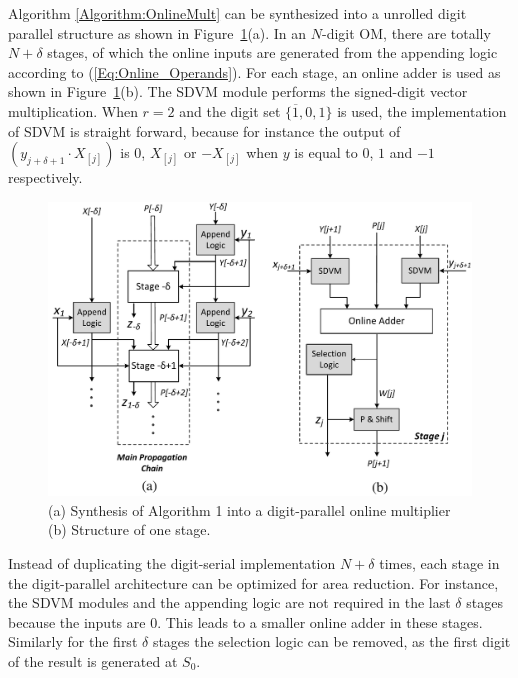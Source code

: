 \documentclass{acm_proc_article-sp}
\begin{document}
%
Algorithm \ref{Algorithm:OnlineMult} can be synthesized into a unrolled digit parallel structure as shown in  Figure~\ref{Fig:Radix2OnlineMultiplier}(a). In an $N$-digit OM, there are totally $N+\delta$ stages, of which the online inputs are generated from the appending logic according to (\ref{Eq:Online_Operands}). For each stage, an online adder is used as shown in Figure~\ref{Fig:Radix2OnlineMultiplier}(b). The SDVM module performs the signed-digit vector multiplication. When $r=2$ and the digit set $\{\overline{1},0,1\}$ is used, the implementation of SDVM is straight forward, because for instance the output of $(y_{j+\delta+1}\cdot X_{[j]})$ is 0, $X_{[j]}$ or $-X_{[j]}$ when $y$ is equal to $0$, $1$ and $-1$ respectively.\vspace{-1ex}

\begin{figure}[tbp]
\centering
\includegraphics[width=.49\textwidth]{./Figures/OnlineMult_Unrolled.pdf}
\vspace{-3ex}
\caption{(a) Synthesis of Algorithm 1 into a digit-parallel online multiplier (b) Structure of one stage.}
\vspace{-2ex}
\label{Fig:Radix2OnlineMultiplier}
\end{figure}

Instead of duplicating the digit-serial implementation $N+\delta$ times, each stage in the digit-parallel architecture can be optimized for area reduction. For instance, the SDVM modules and the appending logic are not required in the last $\delta$ stages because the inputs are 0. This leads to a smaller online adder in these stages. Similarly for the first $\delta$ stages the selection logic can be removed, as the first digit of the result is generated at $S_0$.
\end{document}
